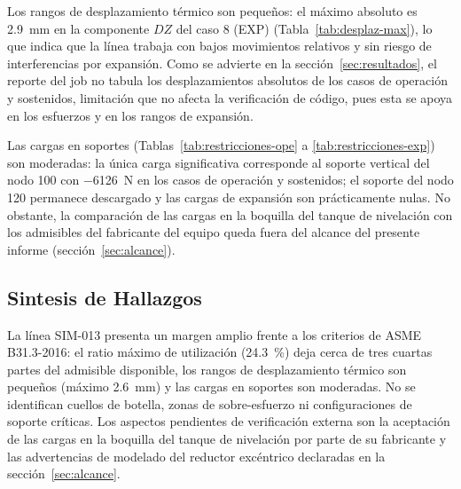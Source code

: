 Los rangos de desplazamiento t\'{e}rmico son peque\~{n}os: el m\'{a}ximo
absoluto es 2.9~\si{mm} en la componente $DZ$ del caso 8 (EXP)
(Tabla~\ref{tab:desplaz-max}), lo que indica que la l\'{i}nea
trabaja con bajos movimientos relativos y sin riesgo de interferencias por
expansi\'{o}n. Como se advierte en la secci\'{o}n~\ref{sec:resultados}, el
reporte del job no tabula los desplazamientos absolutos de los casos de
operaci\'{o}n y sostenidos, limitaci\'{o}n que no afecta la verificaci\'{o}n de
c\'{o}digo, pues esta se apoya en los esfuerzos y en los rangos de expansi\'{o}n.

Las cargas en soportes (Tablas~\ref{tab:restricciones-ope} a
\ref{tab:restricciones-exp}) son moderadas: la \'{u}nica carga significativa
corresponde al soporte vertical del nodo 100 con \num{-6126}~\si{N} en los
casos de operaci\'{o}n y sostenidos; el soporte del nodo 120 permanece
descargado y las cargas de expansi\'{o}n son pr\'{a}cticamente nulas. No
obstante, la comparaci\'{o}n de las cargas en la boquilla del tanque de
nivelaci\'{o}n con los admisibles del fabricante del equipo queda fuera del
alcance del presente informe (secci\'{o}n~\ref{sec:alcance}).

\subsection{Sintesis de Hallazgos}

La l\'{i}nea SIM-013 presenta un margen amplio frente a los criterios de
ASME B31.3-2016: el ratio m\'{a}ximo de utilizaci\'{o}n (24.3~\%) deja cerca
de tres cuartas partes del admisible disponible, los rangos de desplazamiento
t\'{e}rmico son peque\~{n}os (m\'{a}ximo 2.6~\si{mm}) y las cargas en
soportes son moderadas. No se identifican cuellos de botella, zonas de
sobre-esfuerzo ni configuraciones de soporte cr\'{i}ticas. Los aspectos
pendientes de verificaci\'{o}n externa son la aceptaci\'{o}n de las cargas en la
boquilla del tanque de nivelaci\'{o}n por parte de su fabricante y las
advertencias de modelado del reductor exc\'{e}ntrico declaradas en la
secci\'{o}n~\ref{sec:alcance}.
